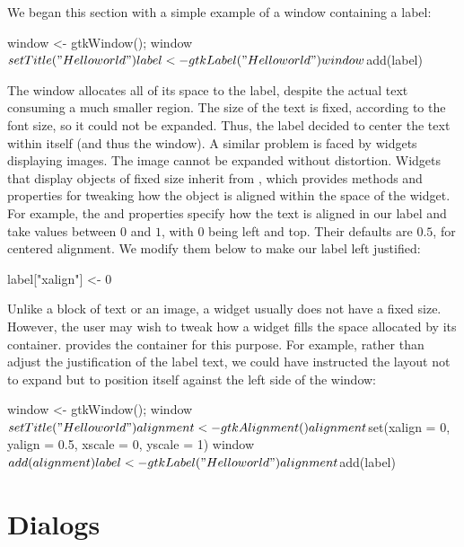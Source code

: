 We began this section with a simple example of a window containing a
label:
\begin{Schunk}
\begin{Sinput}
 window <- gtkWindow(); window$setTitle("Hello world")
 label <- gtkLabel("Hello world")
 window$add(label)
\end{Sinput}
\end{Schunk}
%
The window allocates all of its space to the label, despite the actual
text consuming a much smaller region. The size of the text is fixed,
according to the font size, so it could not be expanded. Thus, the
label decided to center the text within itself (and thus the
window). A similar problem is faced by widgets displaying images. The
image cannot be expanded without distortion. Widgets that display
objects of fixed size inherit from , which provides
methods and properties for tweaking how the object is aligned within
the space of the widget. For example, the  and
 properties specify how the text is aligned in our label
and take values between $0$ and $1$, with $0$ being left and
top. Their defaults are $0.5$, for centered alignment. We modify them
below to make our label left justified:
\begin{Schunk}
\begin{Sinput}
 label["xalign"] <- 0
\end{Sinput}
\end{Schunk}
Unlike a block of text or an image, a widget usually does not have a
fixed size. However, the user may wish to tweak how a widget fills
the space allocated by its container.  \GTK\/ provides the
 container for this purpose. For example, rather
than adjust the justification of the label text, we could have
instructed the layout not to expand but to position itself against the
left side of the window:
\begin{Schunk}
\begin{Sinput}
 window <- gtkWindow(); window$setTitle("Hello world")
 alignment <- gtkAlignment()
 alignment$set(xalign = 0, yalign = 0.5, xscale = 0, yscale = 1)
 window$add(alignment)
 label <- gtkLabel("Hello world")
 alignment$add(label)
\end{Sinput}
\end{Schunk}

\section{Dialogs}
\label{sec:dialogs}

